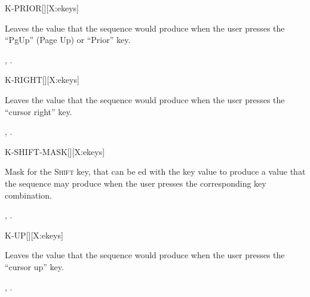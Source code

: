 \begin{worddef}{}{K-PRIOR}[][X:ekeys]
\item {}

	Leaves the value  that the sequence 
	 would produce when the user presses the
	``PgUp'' (Page Up) or ``Prior'' key.

\see {},
	.
\end{worddef}


\begin{worddef}{}{K-RIGHT}[][X:ekeys]
\item {}

	Leaves the value  that the sequence 
	 would produce when the user presses the
	``cursor right'' key.

\see {},
	.
\end{worddef}


\begin{worddef}{}{K-SHIFT-MASK}[][X:ekeys]
\item {}

	Mask for the \textsc{Shift} key, that can be ed with the
	key value to produce a value that the sequence 
	 may produce when the user presses the
	corresponding key combination.

\see {},
	.
\end{worddef}


\begin{worddef}{}{K-UP}[][X:ekeys]
\item {}

	Leaves the value  that the sequence 
	 would produce when the user presses the
	``cursor up'' key.

\see {},
	.
\end{worddef}




